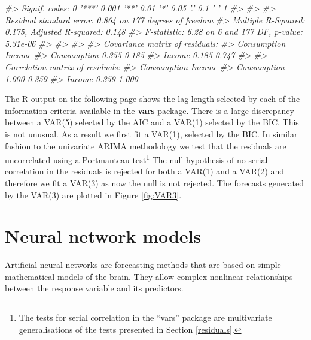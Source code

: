 \documentclass[]{book}
\newenvironment{Shaded}{\begin{snugshade}}{\end{snugshade}}
\newcommand{\CommentTok}[1]{\textcolor[rgb]{0.56,0.35,0.01}{\textit{#1}}}
\let\rmarkdownfootnote\footnote%
\def\footnote{\protect\rmarkdownfootnote}
\begin{document}
\begin{Shaded}
\begin{Highlighting}[]
\CommentTok{#> Signif. codes:  0 '***' 0.001 '**' 0.01 '*' 0.05 '.' 0.1 ' ' 1}
\CommentTok{#> }
\CommentTok{#> }
\CommentTok{#> Residual standard error: 0.864 on 177 degrees of freedom}
\CommentTok{#> Multiple R-Squared: 0.175,   Adjusted R-squared: 0.148 }
\CommentTok{#> F-statistic: 6.28 on 6 and 177 DF,  p-value: 5.31e-06 }
\CommentTok{#> }
\CommentTok{#> }
\CommentTok{#> }
\CommentTok{#> Covariance matrix of residuals:}
\CommentTok{#>             Consumption Income}
\CommentTok{#> Consumption       0.355  0.185}
\CommentTok{#> Income            0.185  0.747}
\CommentTok{#> }
\CommentTok{#> Correlation matrix of residuals:}
\CommentTok{#>             Consumption Income}
\CommentTok{#> Consumption       1.000  0.359}
\CommentTok{#> Income            0.359  1.000}
\end{Highlighting}
\end{Shaded}

The R output on the following page shows the lag length selected by each of the information criteria available in the \textbf{vars} package. There is a large discrepancy between a VAR(5) selected by the AIC and a VAR(1) selected by the BIC. This is not unusual. As a result we first fit a VAR(1), selected by the BIC. In similar fashion to the univariate ARIMA methodology we test that the residuals are uncorrelated using a Portmanteau test\footnote{The tests for serial correlation in the ``vars'' package are multivariate generalisations of the tests presented in Section \ref{residuals}.} The null hypothesis of no serial correlation in the residuals is rejected for both a VAR(1) and a VAR(2) and therefore we fit a VAR(3) as now the null is not rejected. The forecasts generated by the VAR(3) are plotted in Figure \ref{fig:VAR3}.

\begin{Shaded}
\end{Shaded}

\hypertarget{sec-9-3-nnet}{%
\section{Neural network models}\label{sec-9-3-nnet}}

Artificial neural networks are forecasting methods that are based on simple mathematical models of the brain. They allow complex nonlinear relationships between the response variable and its predictors.
\end{document}
